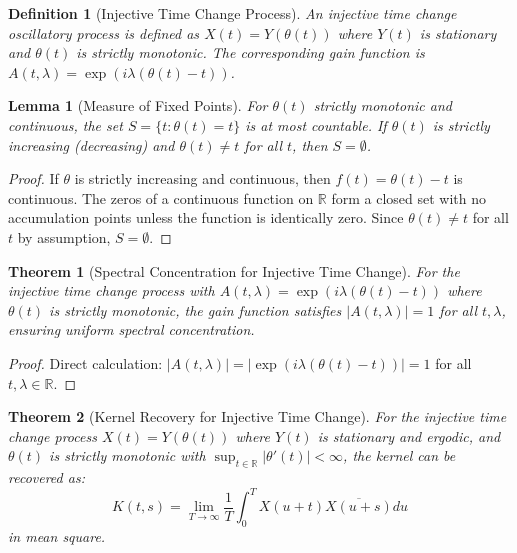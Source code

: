 \documentclass{article}
\newtheorem{theorem}{Theorem}
\newtheorem{lemma}{Lemma}
\newtheorem{definition}{Definition}
\newtheorem{proof}{Proof}
\begin{document}
\begin{definition}[Injective Time Change Process]\label{def:injective}
An injective time change oscillatory process is defined as $X(t) = Y(\theta(t))$ where $Y(t)$ is stationary and $\theta(t)$ is strictly monotonic. The corresponding gain function is $A(t,\lambda) = \exp(i\lambda(\theta(t) - t))$.
\end{definition}

\begin{lemma}[Measure of Fixed Points]\label{lem:fixedpts}
For $\theta(t)$ strictly monotonic and continuous, the set $S = \{t : \theta(t) = t\}$ is at most countable. If $\theta(t)$ is strictly increasing (decreasing) and $\theta(t) \neq t$ for all $t$, then $S = \emptyset$.
\end{lemma}

\begin{proof}
If $\theta$ is strictly increasing and continuous, then $f(t) = \theta(t) - t$ is continuous. The zeros of a continuous function on $\mathbb{R}$ form a closed set with no accumulation points unless the function is identically zero. Since $\theta(t) \neq t$ for all $t$ by assumption, $S = \emptyset$.
\end{proof}

\begin{theorem}[Spectral Concentration for Injective Time Change]\label{thm:specconc}
For the injective time change process with $A(t,\lambda) = \exp(i\lambda(\theta(t) - t))$ where $\theta(t)$ is strictly monotonic, the gain function satisfies $|A(t,\lambda)| = 1$ for all $t,\lambda$, ensuring uniform spectral concentration.
\end{theorem}

\begin{proof}
Direct calculation: $|A(t,\lambda)| = |\exp(i\lambda(\theta(t) - t))| = 1$ for all $t,\lambda \in \mathbb{R}$.
\end{proof}

\begin{theorem}[Kernel Recovery for Injective Time Change]\label{thm:injkernel}
For the injective time change process $X(t) = Y(\theta(t))$ where $Y(t)$ is stationary and ergodic, and $\theta(t)$ is strictly monotonic with $\sup_{t \in \mathbb{R}} |\theta'(t)| < \infty$, the kernel can be recovered as:
\[
K(t,s) = \lim_{T \to \infty} \frac{1}{T} \int_0^T X(u+t) \overline{X(u+s)} du
\]
in mean square.
\end{theorem}
\end{document}

